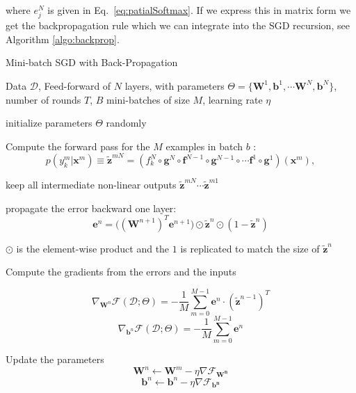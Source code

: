 \noindent where $e^{N}_j$ is given in Eq.~\ref{eq:patialSoftmax}. If we express this in matrix form we get the backpropagation rule which we can integrate into the SGD recursion, see Algorithm \ref{algo:backprop}. 

\begin{algorithm}[t]
\label{algo:backprop}

   \caption{Mini-batch SGD with Back-Propagation \label{alg:maxent_gd}}

\begin{algorithmic}[1]

    Data $\mathcal{D}$, Feed-forward of $N$ layers, with parameters $\Theta=\{\mathbf{W}^1, \mathbf{b}^1, \cdots \mathbf{W}^N, \mathbf{b}^N\}$, number of rounds $T$, $B$ mini-batches of size $M$, learning rate $\eta$

   \STATE initialize parameters $\Theta$ randomly 

	\STATE Compute the forward pass for the $M$ examples in batch $b$ :
    $$p(y_k^m|\mathbf{x}^m) \equiv \tilde{\mathbf{z}}^{mN} = (f_k^N \circ \mathbf{g}^N \circ \mathbf{f}^{N-1} \circ \mathbf{g}^{N-1} \circ \cdots \mathbf{f}^1 \circ \mathbf{g}^1)(\mathbf{x}^m),$$

	\STATE keep all intermediate non-linear outputs $\tilde{\mathbf{z}}^{mN} \cdots \tilde{\mathbf{z}}^{m1}$

        \ELSE
	    \STATE propagate the error backward one layer:  
        $$\mathbf{e}^{n} = \Big((\mathbf{W}^{n+1})^T \mathbf{e}^{n+1}\Big) \odot \tilde{\mathbf{z}}^n \odot (\mathbf{\mathrm{1}}-\tilde{\mathbf{z}}^n)$$

        $\odot$ is the element-wise product and the $\mathbf{\mathrm{1}}$ is replicated to match the size of $\tilde{\mathbf{z}}^n$
        \ENDIF 

        \STATE Compute the gradients from the errors and the inputs

        $$\nabla_{\mathbf{W}^n}\mathcal{F}(\mathcal{D};\Theta)  = -\frac1M \sum_{m=0}^{M-1} \mathbf{e}^{n} \cdot \left(\tilde{\mathbf{z}}^{n-1}\right)^T$$ 
        $$\nabla_{\mathbf{b}^n}\mathcal{F}(\mathcal{D};\Theta)  = - \frac1M \sum_{m=0}^{M-1} \mathbf{e}^{n}$$  

        \STATE Update the parameters 
            $$\mathbf{W}^n \leftarrow \mathbf{W}^m - \eta \nabla\mathcal{F}_\mathbf{W^n}$$ 
            $$\mathbf{b}^n \leftarrow \mathbf{b}^n - \eta \nabla\mathcal{F}_\mathbf{b^n}$$  

	\ENDFOR

	\ENDFOR
	\ENDFOR
\end{algorithmic}
\end{algorithm}

